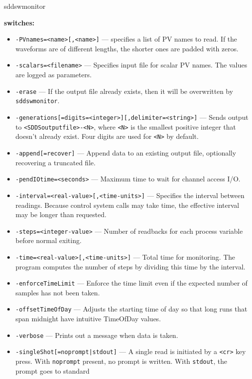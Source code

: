\begin{sddsprog}{sddswmonitor}
\item \textbf{switches:}
\begin{itemize}
  \item {\verb+-PVnames=<name>[,<name>]+} ---
          specifies a list of PV names to read. If the waveforms are of different
          lengths, the shorter ones are padded with zeros.
  \item {\tt -scalars=<filename>} --- Specifies input file for scalar PV names.
          The values are logged as parameters.
  \item {\tt -erase} --- If the output file already exists, then it will be
          overwritten by \verb+sddswmonitor+.
  \item {\verb+-generations[=digits=<integer>][,delimiter=<string>]+} ---
          Sends output to \verb+<SDDSoutputfile>-<N>+, where \verb+<N>+ is the
          smallest positive integer that doesn't already exist. Four digits are
          used for \verb+<N>+ by default.
  \item {\tt -append[=recover]} --- Append data to an existing output file,
          optionally recovering a truncated file.
  \item {\tt -pendIOtime=<seconds>} --- Maximum time to wait for channel
          access I/O.
  \item {\tt -interval=<real-value>[,<time-units>]} --- Specifies the
          interval between readings. Because control system calls may take time,
          the effective interval may be longer than requested.
  \item {\tt -steps=<integer-value>} --- Number of readbacks for each process
          variable before normal exiting.
  \item {\tt -time=<real-value>[,<time-units>]} --- Total time for
          monitoring. The program computes the number of steps by dividing this
          time by the interval.
  \item {\tt -enforceTimeLimit} --- Enforce the time limit even if the
          expected number of samples has not been taken.
  \item {\tt -offsetTimeOfDay} --- Adjusts the starting time of day so that
          long runs that span midnight have intuitive TimeOfDay values.
  \item {\tt -verbose} --- Prints out a message when data is taken.
  \item {\verb+-singleShot[=noprompt|stdout]+} --- A single read is
          initiated by a \verb+<cr>+ key press. With \verb+noprompt+ present, no
          prompt is written. With \verb+stdout+, the prompt goes to standard

\end{itemize}
\end{sddsprog}
